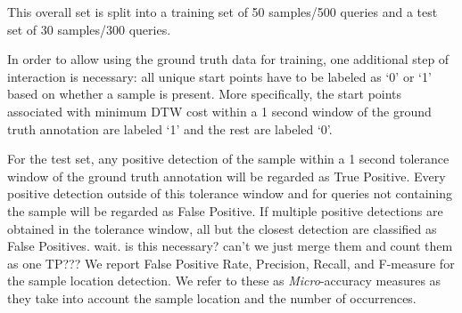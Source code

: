 \documentclass{article}
\begin{document}
This overall set is split into a training set of 50 samples/500 queries and a test set of 30 samples/300 queries.

In order to allow using the ground truth data for training, one additional step of interaction is necessary: all unique start points have to be labeled as `0' or `1' based on whether a sample is present. %
More specifically, the start points associated with minimum DTW cost within a 1 second window of the ground truth annotation are labeled `1' and the rest are labeled `0'. %

For the test set, any positive detection of the sample within a 1 second tolerance window of the ground truth annotation will be regarded as True Positive. Every positive detection outside of this tolerance window and for queries not containing the sample will be regarded as False Positive.
If multiple positive detections are obtained in the tolerance window, all but the closest detection are classified as False Positives. {\color{red}wait. is this necessary? can't we just merge them and count them as one TP???}
We report False Positive Rate, Precision, Recall, and F-measure for the sample location detection. We refer to these as \textit{Micro}-accuracy measures as they take into account the sample location and the number of occurrences.
\end{document}
